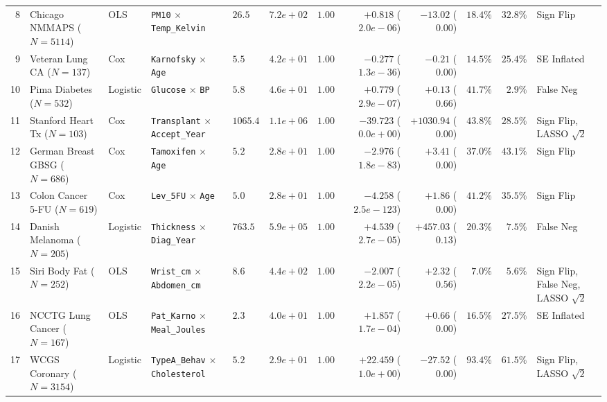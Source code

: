 \begin{table}[htbp]
\begin{tabular}{rllllrrrrrrl}
8 & Chicago NMMAPS \cite{Samet2000} ($N=5114$) & OLS & \texttt{PM10} $\times$ \texttt{Temp\_Kelvin} & $26.5$ & $7.2e+02$ & $\bm{1.00}$ & $\bm{+0.818}$ ($2.0e-06$) & $-13.02$ ($\bm{0.00}$) & $18.4\%$ & $\bm{32.8\%}$ & Sign Flip \\
9 & Veteran Lung CA \cite{Kalbfleisch2002} ($N=137$) & Cox & \texttt{Karnofsky} $\times$ \texttt{Age} & $5.5$ & $4.2e+01$ & $\bm{1.00}$ & $\bm{-0.277}$ ($1.3e-36$) & $-0.21$ ($\bm{0.00}$) & $14.5\%$ & $\bm{25.4\%}$ & SE Inflated \\
10 & Pima Diabetes \cite{Smith1988} ($N=532$) & Logistic & \texttt{Glucose} $\times$ \texttt{BP} & $5.8$ & $4.6e+01$ & $\bm{1.00}$ & $\bm{+0.779}$ ($2.9e-07$) & $+0.13$ ($\bm{0.66}$) & $41.7\%$ & $\bm{2.9\%}$ & False Neg \\
11 & Stanford Heart Tx \cite{Crowley1977} ($N=103$) & Cox & \texttt{Transplant} $\times$ \texttt{Accept\_Year} & $1065.4$ & $1.1e+06$ & $\bm{1.00}$ & $\bm{-39.723}$ ($0.0e+00$) & $+1030.94$ ($\bm{0.00}$) & $43.8\%$ & $\bm{28.5\%}$ & Sign Flip, LASSO $\sqrt{2}$ \\
12 & German Breast GBSG \cite{Sauerbrei1999} ($N=686$) & Cox & \texttt{Tamoxifen} $\times$ \texttt{Age} & $5.2$ & $2.8e+01$ & $\bm{1.00}$ & $\bm{-2.976}$ ($1.8e-83$) & $+3.41$ ($\bm{0.00}$) & $37.0\%$ & $\bm{43.1\%}$ & Sign Flip \\
13 & Colon Cancer 5-FU \cite{Moertel1990} ($N=619$) & Cox & \texttt{Lev\_5FU} $\times$ \texttt{Age} & $5.0$ & $2.8e+01$ & $\bm{1.00}$ & $\bm{-4.258}$ ($2.5e-123$) & $+1.86$ ($\bm{0.00}$) & $41.2\%$ & $\bm{35.5\%}$ & Sign Flip \\
14 & Danish Melanoma \cite{Andersen1993} ($N=205$) & Logistic & \texttt{Thickness} $\times$ \texttt{Diag\_Year} & $763.5$ & $5.9e+05$ & $\bm{1.00}$ & $\bm{+4.539}$ ($2.7e-05$) & $+457.03$ ($\bm{0.13}$) & $20.3\%$ & $\bm{7.5\%}$ & False Neg \\
15 & Siri Body Fat \cite{Penrose1985} ($N=252$) & OLS & \texttt{Wrist\_cm} $\times$ \texttt{Abdomen\_cm} & $8.6$ & $4.4e+02$ & $\bm{1.00}$ & $\bm{-2.007}$ ($2.2e-05$) & $+2.32$ ($\bm{0.56}$) & $7.0\%$ & $\bm{5.6\%}$ & Sign Flip, False Neg, LASSO $\sqrt{2}$ \\
16 & NCCTG Lung Cancer \cite{Loprinzi1994} ($N=167$) & OLS & \texttt{Pat\_Karno} $\times$ \texttt{Meal\_Joules} & $2.3$ & $4.0e+01$ & $\bm{1.00}$ & $\bm{+1.857}$ ($1.7e-04$) & $+0.66$ ($\bm{0.00}$) & $16.5\%$ & $\bm{27.5\%}$ & SE Inflated \\
17 & WCGS Coronary \cite{Rosenman1975} ($N=3154$) & Logistic & \texttt{TypeA\_Behav} $\times$ \texttt{Cholesterol} & $5.2$ & $2.9e+01$ & $\bm{1.00}$ & $\bm{+22.459}$ ($1.0e+00$) & $-27.52$ ($\bm{0.00}$) & $93.4\%$ & $\bm{61.5\%}$ & Sign Flip, LASSO $\sqrt{2}$ \\

\end{tabular}
\end{table}
